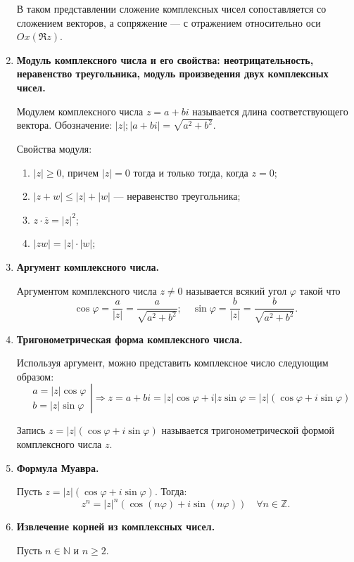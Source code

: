 \begin{enumerate}
В таком представлении сложение комплексных чисел сопоставляется со сложением векторов, а сопряжение — с отражением относительно оси $Ox (\Re z)$.
\item \textbf{Модуль комплексного числа и его свойства: неотрицательность, неравенство треугольника, модуль произведения двух комплексных чисел.}

Модулем комплексного числа $z = a + bi$ называется длина соответствующего вектора. Обозначение: $|z|; |a+bi| = \sqrt{a^2 + b^2}$.

Свойства модуля:
\begin{enumerate}
\item $|z| \geqslant 0$, причем $|z| = 0$ тогда и только тогда, когда $z = 0$;
\item $|z + w| \leqslant |z| + |w|$ — неравенство треугольника;
\item $z\cdot\overline{z} = |z|^2$;
\item $|zw| = |z| \cdot |w|$;
\end{enumerate}
\item \textbf{Аргумент комплексного числа.}

Аргументом комплексного числа $z \neq 0$  называется всякий угол $\varphi$ такой что 
\[
\cos \varphi = \frac{a}{|z|} = \frac{a}{\sqrt{a^2 + b^2}}; \quad \sin \varphi = \frac{b}{|z|} = \frac{b}{\sqrt{a^2 + b^2}}.
\]
\item \textbf{Тригонометрическая форма комплексного числа.}

Используя аргумент, можно представить комплексное число следующим образом:
\[
\left.
\begin{aligned}
&a = |z|\cos \varphi \\
&b = |z|\sin \varphi
\end{aligned} 
\right| \Rightarrow z = a + bi = |z| \cos \varphi + i |z \sin \varphi = |z|(\cos\varphi + i\sin\varphi)
\] 

Запись $z = |z|(\cos\varphi + i\sin\varphi)$ называется тригонометрической формой \\ комплексного числа $z$.
\item \textbf{Формула Муавра.}

Пусть $z = |z|\left(\cos\varphi + i \sin \varphi\right)$. Тогда:
\[z^n = |z|^n\left(\cos\left(n\varphi\right)+i\sin\left(n\varphi\right)\right) \quad \forall n \in \mathbb{Z}.
\]
\item \textbf{Извлечение корней из комплексных чисел.}

Пусть $n\in\mathbb N$ и $n\geqslant2$.


\end{enumerate}
